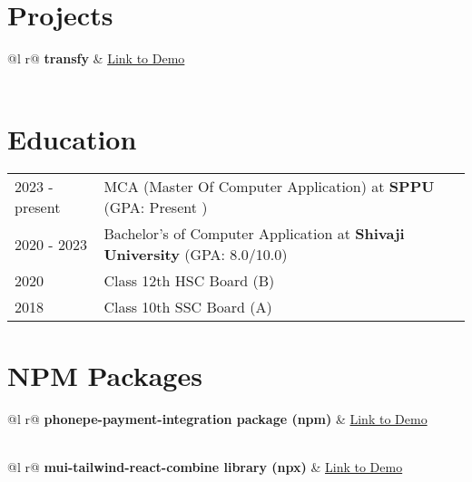 \documentclass[a4paper,12pt]{article}
\begin{document}
\section{Projects}



\begin{tabularx}{\linewidth}{ @{}l r@{} }
\textbf{transfy} & \hfill \href{https://social-freak-ud3t.onrender.com/}{Link to Demo} \\[3.75pt]
  \\
\end{tabularx}

\section{Education}
\begin{tabularx}{\linewidth}{@{}l X@{}}	
2023 - present & MCA (Master Of Computer Application) at \textbf{SPPU} \hfill \normalsize (GPA: Present ) \\

2020 - 2023 & Bachelor's of Computer Application at \textbf{Shivaji University} \hfill (GPA: 8.0/10.0) \\ 

2020 & Class 12th HSC Board \hfill  (B) \\

2018 & Class 10th SSC Board \hfill  (A) \\
\end{tabularx}

\section{NPM Packages}
\begin{refsection}
\begin{tabularx}{\linewidth}{ @{}l r@{} }
\textbf{phonepe-payment-integration package (npm) } & \hfill \href{https://www.npmjs.com/package/phonepe-payment-integration}{Link to Demo} \\[3.75pt]
  \\
\end{tabularx}

\begin{tabularx}{\linewidth}{ @{}l r@{} }
\textbf{mui-tailwind-react-combine library (npx)} & \hfill \href{https://www.npmjs.com/package/react-mui-tailwind_css_frontend}{Link to Demo} \\[3.75pt]
  \\
\end{tabularx}
\end{refsection}
\end{document}
